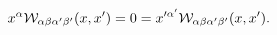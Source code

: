 \begin{equation}
x^\alpha {\cal W}_{\alpha\beta \alpha'\beta'}(x,x')=0=x'^{\alpha'}
{\cal W}_{\alpha\beta\alpha'\beta'}(x,x') .
\end{equation}

